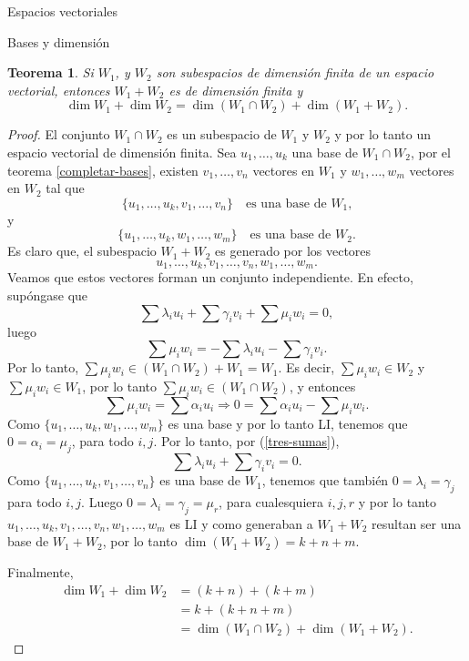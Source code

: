 \documentclass[a4paper,12pt,twoside,spanish]{amsbook}
\newtheorem{teorema}{Teorema}[section]
\theoremstyle{definition}
\theoremstyle{remark}
\begin{document}
\begin{chapter}{Espacios vectoriales}
\begin{section}{Bases y dimensión}
	\begin{teorema}
		Si $W_1$, y $W_2$ son subespacios de dimensión finita de un espacio vectorial, entonces $W_1+ W_2$ es de dimensión finita y 
		$$\dim W_1 + \dim W_2 = \dim (W_1 \cap W_2) + \dim (W_1 + W_2).$$
	\end{teorema}
	\begin{proof}
		 El  conjunto $W_1 \cap W_2$  es un subespacio de $W_1$ y $W_2$ y por lo tanto un espacio vectorial de dimensión finita. Sea  $u_1,\ldots,u_k$ una base de $W_1 \cap W_2$, por el teorema \ref{completar-bases},  existen $v_1,\ldots,v_n$ vectores en $W_1$ y $w_1,\ldots,w_m$ vectores en $W_2$  tal que
		 $$
		 \{u_1,\ldots,u_k,v_1,\ldots,v_n\}\quad  \text{es una base de $W_1$,}
		 $$
		  y
		  $$
		 \{u_1,\ldots,u_k,w_1,\ldots,w_m\}\quad \text{es una base de $W_2$.}
		 $$
		Es claro que, el subespacio $W_1+ W_2$ es generado por los vectores 
		$$
		u_1,\ldots,u_k,v_1,\ldots,v_n,w_1,\ldots,w_m.
		$$
		Veamos que estos  vectores forman un conjunto independiente. En efecto, supóngase que
		\begin{equation}\label{tres-sumas}
			\sum \lambda_i u_i + \sum \gamma_i v_i + \sum \mu_i w_i =0,
		\end{equation}
		luego
		$$
		\sum \mu_i w_i = - \sum \lambda_i u_i - \sum \gamma_i v_i.
		$$
		Por  lo tanto, $\sum \mu_i w_i \in (W_1 \cap W_2) + W_1 = W_1$. Es  decir,  $\sum \mu_i w_i \in W_2$ y $\sum \mu_i w_i \in W_1$, por lo tanto $\sum \mu_i w_i \in (W_1 \cap W_2)$, y entonces
		$$
		\sum \mu_i w_i  = \sum \alpha_i u_i \Rightarrow 0 = \sum \alpha_i u_i - \sum \mu_i w_i .
		$$
		Como $\{u_1,\ldots,u_k,w_1,\ldots,w_m\}$ es una base y por lo tanto LI, tenemos que $0=\alpha_i=\mu_j$, para todo $i,j$. Por lo tanto, por (\ref{tres-sumas}), 
		\begin{equation}\label{dos-sumas}
		\sum \lambda_i u_i + \sum \gamma_i v_i  =0.
		\end{equation}
		Como $ \{u_1,\ldots,u_k,v_1,\ldots,v_n\}$  es una base de $W_1$,  tenemos que también $0=\lambda_i = \gamma_j$ para todo $i,j$. Luego  $0=\lambda_i = \gamma_j = \mu_r$, para cualesquiera $i,j,r$ y por lo tanto $u_1,\ldots,u_k,v_1,\ldots,v_n,w_1,\ldots,w_m$ es LI y  como  generaban a  $W_1+W_2$ resultan ser una base de $W_1+W_2$, por lo tanto $\dim (W_1+W_2) = k+n+m$.
		
		Finalmente,
		\begin{align*}
			\dim W_1 + \dim W_2&= (k+n)+(k+m) \\&	=k+(k+n+m)\\ &=  \dim (W_1 \cap W_2) + \dim (W_1 + W_2) .
		\end{align*}
	\end{proof}
	\end{section}




\end{chapter}
\end{document}
